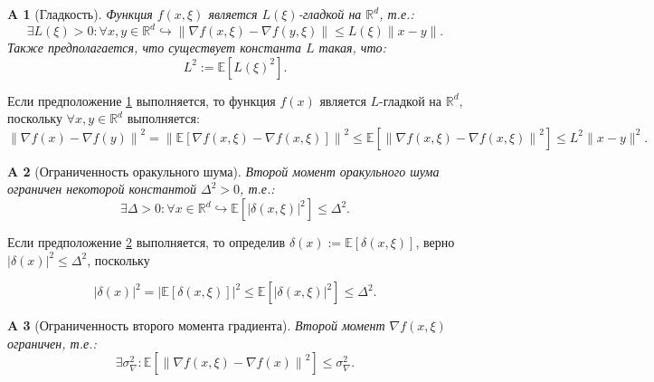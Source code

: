 \documentclass{article}
\newtheorem{assumption}{A}
\begin{document}
\begin{assumption} [Гладкость]\label{A4}
Функция $f(x, \xi)$ является $L(\xi)$-гладкой на $\mathbb{R}^d$, т.е.:
\begin{equation}
    \exists L(\xi) > 0: \forall x, y \in \mathbb{R}^d \hookrightarrow \|\nabla f(x, \xi) - \nabla f(y,\xi)\| \leqslant L(\xi) \|x - y\|.
  \label{l_smoothness_stochastic}
\end{equation}
Также предполагается, что существует константа $L$ такая, что:
\begin{equation}
    L^2 := \mathbb{E}\left[L(\xi)^2\right].
\end{equation}
\end{assumption}
Если предположение \ref{A4} выполняется, то функция $f(x)$ является $L$-гладкой на $\mathbb{R}^d$, поскольку $\forall x, y \in \mathbb{R}^d$ выполняется:
\begin{equation}
    \left\|\nabla f(x) - \nabla f(y)\right\|^2 = \left\|\mathbb{E}\left[\nabla f(x, \xi) - \nabla f(x,\xi)\right]\right\|^2 \leqslant \mathbb{E}\left[\left\|\nabla f(x, \xi) - \nabla f(x, \xi)\right\|^2\right] \leqslant L^2 \|x - y\|^2.
\end{equation}

\begin{assumption}[Ограниченность оракульного шума]\label{A5}
Второй момент оракульного шума ограничен некоторой константой $\Delta^2 > 0$, т.е.:
\begin{equation}
    \exists \Delta > 0: \forall x \in \mathbb{R}^d \hookrightarrow \mathbb{E}\left[|\delta(x, \xi)|^2\right] \leqslant \Delta^2.
  \label{bounded_oracle_noise_stochastic}
\end{equation}
\end{assumption}

Если предположение \ref{A5} выполняется, то определив $\delta(x) := \mathbb{E}\left[\delta(x, \xi)\right]$, верно $|\delta(x)|^2 \leqslant \Delta^2$, поскольку

\begin{equation}
    |\delta(x)|^2 = \left|\mathbb{E}\left[\delta(x,\xi)\right]\right|^2 \leqslant \mathbb{E}\left[|\delta(x, \xi)|^2\right] \leqslant \Delta^2.
\end{equation}

\begin{assumption} [Ограниченность второго момента градиента]\label{A6}
Второй момент $\nabla f(x, \xi)$ ограничен, т.е.:
\begin{equation}
    \exists \sigma_\nabla^2: \mathbb{E}\left[\left\|\nabla f(x, \xi) - \nabla f(x)\right\|^2\right] \leqslant \sigma_\nabla^2.
    \label{bounded_second_moment_nabla}
\end{equation}

\end{assumption}
\end{document}
